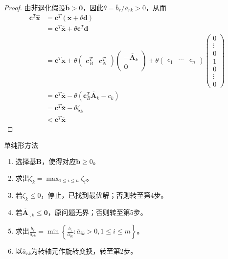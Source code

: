 \documentclass[lang = cn, scheme = chinese, thmcnt = section]{elegantbook}
\newcommand{\bs}{\boldsymbol}          %
\begin{document}
\begin{proof}
	由非退化假设$\overline{\bs{b}}>\bs{0}$，因此$\theta=\overline{b}_r/\overline{a}_{rk}>0$，从而
	\begin{align*}
		\bs{c}^T\hat{\bs{x}}
		& = \bs{c}^T(\overline{\bs{x}}+\theta\bs{d})\\
		& = \bs{c}^T\overline{\bs{x}}+\theta\bs{c}^T\bs{d}\\
		& = \bs{c}^T\overline{\bs{x}}
		+\theta\begin{pmatrix}
			\bs{c}_B^T & \bs{c}_N^T
		\end{pmatrix}
		\begin{pmatrix}
			-\overline{\bs{A}}_k \\ \bs{0}
		\end{pmatrix}
		+\theta\begin{pmatrix}
			c_1 & \cdots & c_n
		\end{pmatrix}
		\begin{pmatrix}
			0 \\ \vdots \\ 0 \\ 1 \\ 0 \\ \vdots \\ 0
		\end{pmatrix}\\
		& = \bs{c}^T\overline{\bs{x}}-\theta(\bs{c}_B^T\overline{\bs{A}}_k-c_k)\\
		& = \bs{c}^T\overline{\bs{x}}-\theta\zeta_k\\
		& <\bs{c}^T\overline{\bs{x}}
	\end{align*}
\end{proof}

\begin{theorem}{单纯形方法}
	\begin{enumerate}
		\item 选择基$\bs{B}$，使得对应$\bs{b}\ge 0$。
		\item 求出$\displaystyle \zeta_k=\max_{1\le i \le n}\zeta_i$。
		\item 若$\zeta_k\le 0$，停止，已找到最优解；否则转至第4步。
		\item 若$\overline{\bs{A}}_{\cdot,k}\le\bs{0}$，原问题无界；否则转至第5步。
		\item 求出$\displaystyle \frac{\overline{b}_r}{\overline{a}_{rk}}=\min\left\{ \frac{\overline{b}_i}{\overline{a}_{ik}}:\overline{a}_{ik}>0,1\le i \le m \right\}$。
		\item 以$\overline{a}_{rk}$为转轴元作旋转变换，转至第2步。
	\end{enumerate}
\end{theorem}
\end{document}
